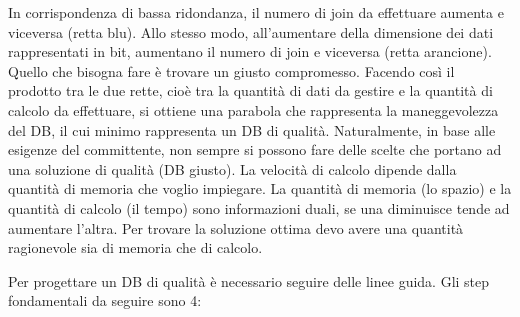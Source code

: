 In corrispondenza di bassa ridondanza, il numero di join da effettuare aumenta e viceversa (retta blu). Allo stesso modo, all’aumentare della dimensione dei dati rappresentati in bit, aumentano il numero di join e viceversa (retta arancione). Quello che bisogna fare è trovare un giusto compromesso. Facendo così il prodotto tra le due rette, cioè tra la quantità di dati da gestire e la quantità di calcolo da effettuare, si ottiene una parabola che rappresenta la maneggevolezza del DB, il cui minimo rappresenta un DB di qualità. Naturalmente, in base alle esigenze del committente, non sempre si possono fare delle scelte che portano ad una soluzione di qualità (DB giusto). 
La velocità di calcolo dipende dalla quantità di memoria che voglio impiegare. La quantità di memoria (lo spazio) e la quantità di calcolo (il tempo) sono informazioni duali, se una diminuisce tende ad aumentare l’altra. Per trovare la soluzione ottima devo avere una quantità ragionevole sia di memoria che di calcolo.   

Per progettare un DB di qualità è necessario seguire delle linee guida. Gli step fondamentali da seguire sono 4: 

